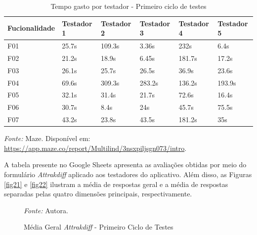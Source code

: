 \begin{table}[h!]
	\centering
	\caption{Tempo gasto por testador - Primeiro ciclo de testes}
	\label{tab06}
	\begin{tabular}{l|l|l|l|l|l}
	\hline
	Fucionalidade & Testador 1 & Testador 2 & Testador 3 & Testador 4 & Testador 5 \\ 	\hline
	F01                   & 25.7s     & 109.3s     & 3.36s      & 232s       & 6.4s      \\
	F02                   & 21.2s        & 18.9s      & 6.45s      & 181.7s    & 17.2s     \\
	F03                   & 26.1s        & 25.7s      & 26.5s      & 36.9s     & 23.6s     \\
	F04                   & 69.6s        & 309.3s     & 283.2s     & 136.2s     & 193.9s     \\
	F05                   & 32.1s      & 31.4s      & 21.7s     & 72.6s     & 16.4s     \\
	F06                   & 30.7s     & 8.4s      & 24s     & 45.7s     & 75.5s     \\
	F07                   & 43.2s     & 23.8s      & 43.5s     & 181.2s    & 35s      \\ 	\hline
	\end{tabular}
	\begin{tablenotes}[flushleft]
		\centering
		\item \textit{Fonte:} Maze. Disponível em: \url{https://app.maze.co/report/Multilind/3nsxpiljsgn073/intro}.
	  \end{tablenotes}
\end{table}


A tabela presente no Google Sheets apresenta as avaliações obtidas por meio do formulário \textit{Attrakdiff} aplicado aos testadores do aplicativo. Além disso, as Figuras \ref{fig21} e \ref{fig22} ilustram a média de respostas geral e a média 
de respostas separadas pelas quatro dimensões principais, respectivamente.

\begin{figure}[h!]
	\centering
	\caption{Média Geral \textit{Attrakdiff} - Primeiro Ciclo de Testes}
	\begin{tablenotes}[flushleft]
		\centering
		\item \textit{Fonte:} Autora.
	\end{tablenotes}
	\label{fig20}
\end{figure}

